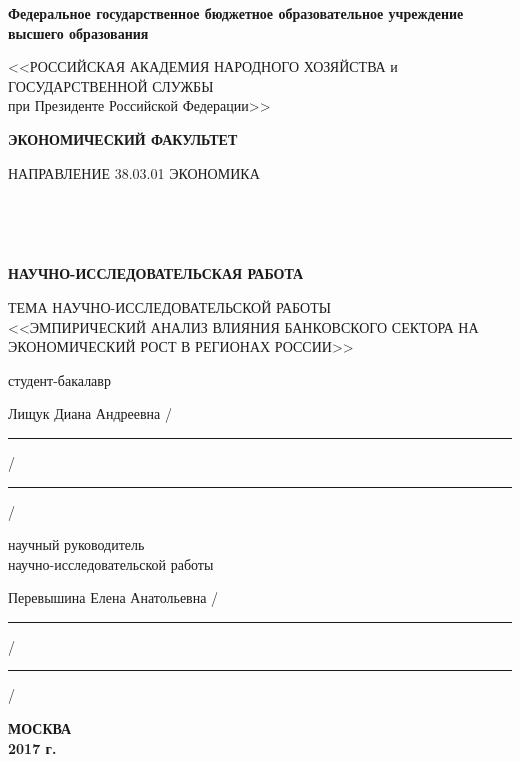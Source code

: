 	\thispagestyle{empty} %
	
	
	\begingroup
	\begin{center}
		\small \bfseries Федеральное государственное бюджетное образовательное учреждение высшего образования
		
		<<РОССИЙСКАЯ АКАДЕМИЯ НАРОДНОГО ХОЗЯЙСТВА и\\ ГОСУДАРСТВЕННОЙ СЛУЖБЫ \\
		при Президенте Российской Федерации>>
		
		\vspace{2ex}
		
		\bfseries
		ЭКОНОМИЧЕСКИЙ ФАКУЛЬТЕТ
		
		НАПРАВЛЕНИЕ 38.03.01 ЭКОНОМИКА
	\end{center}
	
	\vfill
	
	

	
	\mbox{ }
	
	\mbox{ }
	
	\begin{center}\bfseries
		НАУЧНО-ИССЛЕДОВАТЕЛЬСКАЯ РАБОТА
		\mbox{ }
		
		\large
		ТЕМА НАУЧНО-ИССЛЕДОВАТЕЛЬСКОЙ РАБОТЫ \\
		<<ЭМПИРИЧЕСКИЙ АНАЛИЗ ВЛИЯНИЯ БАНКОВСКОГО СЕКТОРА НА ЭКОНОМИЧЕСКИЙ РОСТ В РЕГИОНАХ РОССИИ>>
	\end{center}
	
	\vfill
	
	\noindent\normalsize
	студент-бакалавр
	
	\noindent
	Лищук Диана Андреевна
	\hfill /\rule{6em}{0.5pt}/\rule{6em}{0.5pt}/
	
	\hfill{}
	
	\noindent
	научный руководитель  \\
	научно-исследовательской работы
	
	\noindent
	Перевышина Елена Анатольевна
	\hfill /\rule{6em}{0.5pt}/\rule{6em}{0.5pt}/
	
	\hfill{}
	

	
	\vfill
	
	\begin{center}
		\normalsize \bfseries МОСКВА \\ 2017 г.
	\end{center}
	\endgroup 